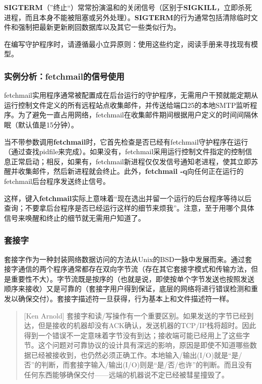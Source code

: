 \documentclass[12pt,oneside]{ctexbook}
\begin{document}
\begin{common-format}
\textbf{SIGTERM}（”终止“）常常扮演温和的关闭信号（区别于\textbf{SIGKILL}\linebreak ，立即杀死进程，而且本身不能被阻塞或另外处理）。\textbf{SIGTERM}的行为通常包括清除临时文件和强制把最新更新刷回数据库以及其它一些类似行为。

在编写守护程序时，请遵循最小立异原则：使用这些约定，阅读手册来寻找现有模型。


\subsubsection{实例分析：fetchmail的信号使用}
fetchmail实用程序通常被配置成在后台运行的守护程序，无需用户干预就能定期从运行控制文件定义的所有远程站点收集邮件，并传送给端口25的本地SMTP监听程序。为了避免一直占用网络，fetchmail在收集邮件期间根据用户定义的时间间隔休眠（默认值是15分钟）。

当不带参数调用\textbf{fetchmail}时，它首先检查是否已经有fetchmail守护程序在运行（通过查找pidfile来完成）。如果没有，fetchmail采用运行控制文件指定的控制信息正常启动；相反，如果有，fetchmail新进程仅仅发信号通知老进程，使其立即苏醒并收集邮件，然后新进程就会终止。此外，\textbf{fetchmail -q}向任何正在运行的fetchmail后台程序发送终止信号。

这样，键入\textbf{fetchmail}实际上意味着“现在选出并留一个运行的后台程序等待以后查询；不要拿后台程序是否已经运行这样的细节来烦我”。注意，至于用哪个具体信号来唤醒和终止的细节就无需用户知道了。


\subsubsection{套接字}
套接字作为一种封装网络数据访问的方法从Unix的BSD一脉中发展而来。通过套接字通信的两个程序通常都存在双向字节流（存在其它套接字模式和传输方法，但是重要性不大）。字节流既是按序的（也就是说，即使按单个字节发送也按照发送顺序来接收）又是可靠的（套接字用户得到保证，底层的网络将进行错误检测和重发以确保交付）。套接字描述符一旦获得，行为基本上和文件描述符一样。

\begin{quote}[Ken Arnold]
套接字和读/写操作有一个重要区别。如果发送的字节已经到达，但是接收的机器却没有ACK确认，发送机器的TCP/IP栈将超时。因此得到一个错误不一定意味着字节没有到达；接收端可能已经用上了这些字节。这个问题对可靠协议的设计具有深远的影响，原因是即使不知道哪些数据已经被接收到，也仍然必须正确工作。本地输入/输出(I/O)就是“是/否”的判断，而套接字输入/输出(I/O)则是“是/否/也许”的判断。而且没有任何东西能够确保交付——远端的机器说不定已经被彗星撞毁了。
\end{quote}


\end{common-format}
\end{document}
